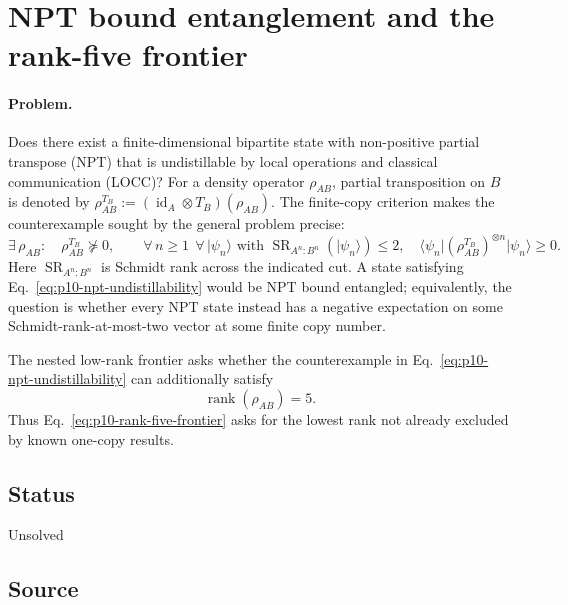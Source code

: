 \section{NPT bound entanglement and the rank-five frontier}
\label{sec:problem-10}

\paragraph{Problem.}
Does there exist a finite-dimensional bipartite state with non-positive
partial transpose (NPT) that is undistillable by local operations and
classical communication (LOCC)?  For a density operator $\rho_{AB}$, partial
transposition on $B$ is denoted by
$\rho_{AB}^{T_B}:=(\operatorname{id}_A\otimes T_B)(\rho_{AB})$.  The
finite-copy criterion makes the counterexample sought by the general problem
precise:
\begin{equation}
  \exists\,\rho_{AB}:\quad
  \rho_{AB}^{T_B}\not\succeq0,
  \qquad
  \forall\,n\geq1\ \ \forall\,\lvert\psi_n\rangle
  \text{ with }\operatorname{SR}_{A^n:B^n}(\lvert\psi_n\rangle)\leq2,
  \quad
  \langle\psi_n\rvert
    (\rho_{AB}^{T_B})^{\otimes n}
  \lvert\psi_n\rangle\geq0.
  \label{eq:p10-npt-undistillability}
\end{equation}
Here $\operatorname{SR}_{A^n:B^n}$ is Schmidt rank across the indicated cut.
A state satisfying Eq.~\eqref{eq:p10-npt-undistillability} would be NPT bound
entangled; equivalently, the question is whether every NPT state instead has
a negative expectation on some Schmidt-rank-at-most-two vector at some finite
copy number.

The nested low-rank frontier asks whether the counterexample in
Eq.~\eqref{eq:p10-npt-undistillability} can additionally satisfy
\begin{equation}
  \operatorname{rank}(\rho_{AB})=5.
  \label{eq:p10-rank-five-frontier}
\end{equation}
Thus Eq.~\eqref{eq:p10-rank-five-frontier} asks for the lowest rank not already
excluded by known one-copy results.

\subsection*{Status}

Unsolved

\subsection*{Source}

